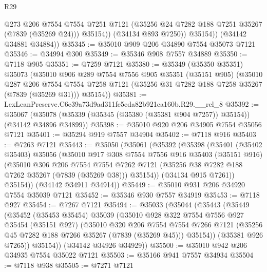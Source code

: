 \begin{lexlean}{R29}
\begin{coremodule}
                @273
                @206
                @7554
                @7554
                @7251
                @7121
                (@35256 @24 @7282 @188 @7251 @35267 (@7839 (@35269 @24)))
                @35154))
            (@34134 @893 @7250))
          @35154))
      (@34142 @34881 @34884))
@35345 := @35010 @909 @206 @34890 @7554 @35073 @7121
@35346 := @34994 @300
@35349 := @35346 @908 @7557 @34889
@35350 := @7118 @905
@35351 := @7259 @7121
@35380 := @35349
    (@35350 @35351)
    @35073
    (@35010
      @906
      @289
      @7554
      @7556
      @905
      @35351
      (@35151 @905)
      (@35010
        @287
        @206
        @7554
        @7554
        @7258
        @7121
        (@35256 @31 @7282 @188 @7258 @35267 (@7839 (@35269 @31)))
        @35154))
@35381 := LexLeanPreserve.C6e39a73d9ad311fe5eda82b921ca160b.R29.__rel_8
@35392 := @35067
    (@35078 (@35339 (@35345 (@35380 (@35381 @904 @7257)) @35154)) (@34142 @34896 @34899))
@35398 := @35010 @920 @206 @34905 @7554 @35056 @7121
@35401 := @35294 @919 @7557 @34904
@35402 := @7118 @916
@35403 := @7263 @7121
@35443 := @35050
    (@35061
      (@35392
        (@35398
          (@35401
            (@35402 @35403)
            @35056
            (@35010
              @917
              @308
              @7554
              @7556
              @916
              @35403
              (@35151 @916)
              (@35010
                @306
                @206
                @7554
                @7554
                @7262
                @7121
                (@35256 @38 @7282 @188 @7262 @35267 (@7839 (@35269 @38)))
                @35154))
            (@34134 @915 @7261))
          @35154))
      (@34142 @34911 @34914))
@35449 := @35010 @931 @206 @34920 @7554 @35039 @7121
@35452 := @35346 @930 @7557 @34919
@35453 := @7118 @927
@35454 := @7267 @7121
@35494 := @35033
    (@35044
      (@35443
        (@35449
          (@35452
            (@35453 @35454)
            @35039
            (@35010
              @928
              @322
              @7554
              @7556
              @927
              @35454
              (@35151 @927)
              (@35010
                @320
                @206
                @7554
                @7554
                @7266
                @7121
                (@35256 @45 @7282 @188 @7266 @35267 (@7839 (@35269 @45)))
                @35154))
            (@35381 @926 @7265))
          @35154))
      (@34142 @34926 @34929))
@35500 := @35010 @942 @206 @34935 @7554 @35022 @7121
@35503 := @35166 @941 @7557 @34934
@35504 := @7118 @938
@35505 := @7271 @7121

\end{coremodule}
\end{lexlean}
